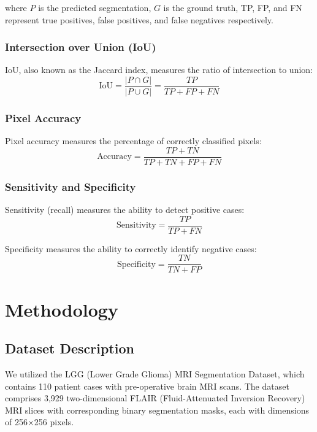 \documentclass[a4paper, journal]{IEEEtran}
\begin{document}
where $P$ is the predicted segmentation, $G$ is the ground truth, TP, FP, and FN represent true positives, false positives, and false negatives respectively.

\subsubsection{Intersection over Union (IoU)}
IoU, also known as the Jaccard index, measures the ratio of intersection to union:
\begin{equation}
    \text{IoU} = \frac{|P \cap G|}{|P \cup G|} = \frac{TP}{TP + FP + FN}
\end{equation}

\subsubsection{Pixel Accuracy}
Pixel accuracy measures the percentage of correctly classified pixels:
\begin{equation}
    \text{Accuracy} = \frac{TP + TN}{TP + TN + FP + FN}
\end{equation}

\subsubsection{Sensitivity and Specificity}
Sensitivity (recall) measures the ability to detect positive cases:
\begin{equation}
    \text{Sensitivity} = \frac{TP}{TP + FN}
\end{equation}

Specificity measures the ability to correctly identify negative cases:
\begin{equation}
    \text{Specificity} = \frac{TN}{TN + FP}
\end{equation}

\section{Methodology}
\label{sec:method}

\subsection{Dataset Description}
We utilized the LGG (Lower Grade Glioma) MRI Segmentation Dataset, which contains 110 patient cases with pre-operative brain MRI scans. The dataset comprises 3,929 two-dimensional FLAIR (Fluid-Attenuated Inversion Recovery) MRI slices with corresponding binary segmentation masks, each with dimensions of 256×256 pixels.
\end{document}
